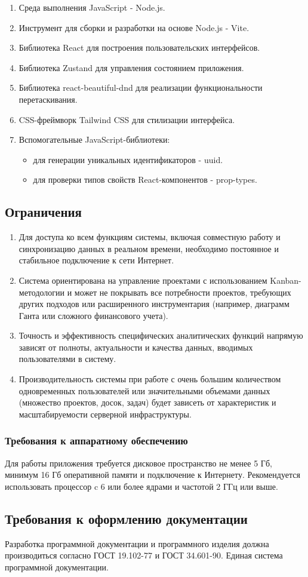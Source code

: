 \begin{enumerate}
	\item Среда выполнения JavaScript - Node.js.
	\item Инструмент для сборки и разработки на основе Node.js - Vite.
	\item Библиотека React для построения пользовательских интерфейсов.
	\item Библиотека Zustand для управления состоянием приложения.
	\item Библиотека react-beautiful-dnd для реализации функциональности перетаскивания.
	\item CSS-фреймворк Tailwind CSS для стилизации интерфейса.
	\item Вспомогательные JavaScript-библиотеки:
	\begin{itemize}
		\item для генерации уникальных идентификаторов - uuid.
		\item для проверки типов свойств React-компонентов - prop-types.
	\end{itemize}
\end{enumerate}

\subsection{Ограничения}

\begin{enumerate}
	\item Для доступа ко всем функциям системы, включая совместную работу и синхронизацию данных в реальном времени, необходимо постоянное и стабильное подключение к сети Интернет.
	\item Система ориентирована на управление проектами с использованием Kanban-методологии и может не покрывать все потребности проектов, требующих других подходов или расширенного инструментария (например, диаграмм Ганта или сложного финансового учета).
	\item Точность и эффективность специфических аналитических функций напрямую зависят от полноты, актуальности и качества данных, вводимых пользователями в систему.
	\item Производительность системы при работе с очень большим количеством одновременных пользователей или значительными объемами данных (множество проектов, досок, задач) будет зависеть от характеристик и масштабируемости серверной инфраструктуры.
\end{enumerate}

\subsubsection{Требования к аппаратному обеспечению}
Для работы приложения требуется дисковое пространство не менее 5 Гб, минимум 16 Гб оперативной памяти и подключение к Интернету. Рекомендуется использовать процессор c 6 или более ядрами и частотой 2 ГГц или выше.

\subsection{Требования к оформлению документации}

Разработка программной документации и программного изделия должна производиться согласно ГОСТ 19.102-77 и ГОСТ 34.601-90. Единая система программной документации.

